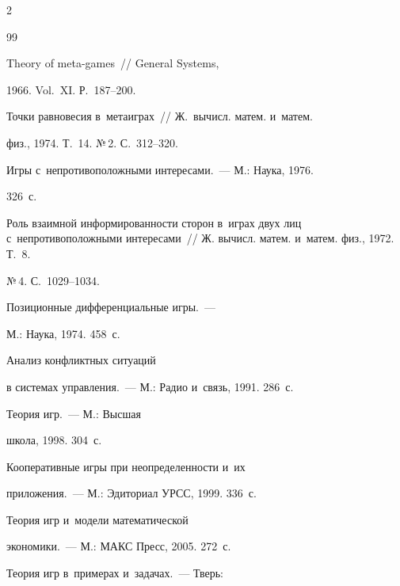 \begin{multicols}{2}
{{ \begin{thebibliography}{99}




 Theory of meta-games~// General Systems,

1966. Vol.~XI. Р.~187--200.


 Точки равновесия в~метаиграх~// Ж.~вычисл. матем. и~матем.

физ., 1974. Т.~14. №\,2. С.~312--320.


 Игры с~непротивоположными интересами.~--- М.: Наука, 1976.

326~с.


 Роль взаимной информированности сторон в~играх двух лиц с~непротивоположными интересами~// Ж. вычисл. матем. и~матем. физ., 1972. Т.~8.

№\,4. С.~1029--1034.


 Позиционные дифференциальные игры.~---

М.: Наука, 1974. 458~с.


 Анализ конфликтных ситуаций

в системах управления.~--- М.: Радио и~связь, 1991. 286~с.


 Теория игр.~--- М.: Высшая

школа, 1998. 304~с.


 Кооперативные игры при неопределенности и~их

приложения.~--- М.: Эдиториал УРСС, 1999. 336~с.


 Теория игр и~модели математической

экономики.~--- М.: МАКС Пресс, 2005. 272~с.


 Теория игр в~примерах и~задачах.~--- Тверь:


\end{thebibliography}}}
\end{multicols}
